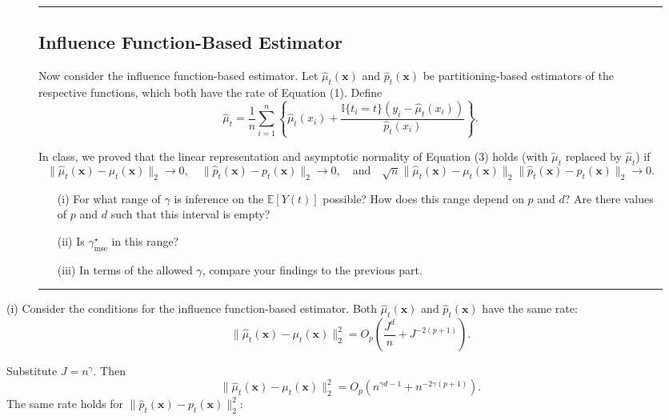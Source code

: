 \documentclass{article}
\newenvironment{colorparagraph}[1]{\par\color{#1}}{\par}
\begin{document}
\begin{figure}[H]
  \begin{colorparagraph}{questioncolor}
  \rule{\textwidth}{0.5pt}
  \label{q1h}
  \subsection{Influence Function-Based Estimator}

  Now consider the influence function-based estimator. Let \( \hat{\mu}_t(\mathbf{x}) \) and \( \hat{p}_t(\mathbf{x}) \) be partitioning-based estimators of the respective functions, which both have the rate of Equation (1). Define
  \[
  \hat{\mu}_t = \frac{1}{n} \sum_{i=1}^n \left\{ \hat{\mu}_t(x_i) + \frac{\mathbb{I}\{t_i = t\}(y_i - \hat{\mu}_t(x_i))}{\hat{p}_t(x_i)} \right\}.
  \]

  In class, we proved that the linear representation and asymptotic normality of Equation (3) holds (with \( \tilde{\mu}_t \) replaced by \( \hat{\mu}_t \)) if
  \[
  \|\hat{\mu}_t(\mathbf{x}) - \mu_t(\mathbf{x})\|_2 \to 0, \quad \|\hat{p}_t(\mathbf{x}) - p_t(\mathbf{x})\|_2 \to 0, \quad \text{and} \quad \sqrt{n} \|\hat{\mu}_t(\mathbf{x}) - \mu_t(\mathbf{x})\|_2 \|\hat{p}_t(\mathbf{x}) - p_t(\mathbf{x})\|_2 \to 0.
  \]

  \begin{itemize}
      \item[(i)] For what range of \( \gamma \) is inference on the \( \mathbb{E}[Y(t)] \) possible? How does this range depend on \( p \) and \( d \)? Are there values of \( p \) and \( d \) such that this interval is empty?
      \item[(ii)] Is \( \gamma^\star_{\text{mse}} \) in this range?
      \item[(iii)] In terms of the allowed \( \gamma \), compare your findings to the previous part.
  \end{itemize}

  \rule{\textwidth}{0.5pt}
  \end{colorparagraph}
\end{figure}

(i) Consider the conditions for the influence function-based estimator. Both \( \hat{\mu}_t(\mathbf{x}) \) and \( \hat{p}_t(\mathbf{x}) \) have the same rate:
$$
\|\hat{\mu}_t(\mathbf{x}) - \mu_t(\mathbf{x})\|_2^2 = O_p\left(\frac{J^d}{n} + J^{-2(p+1)}\right).
$$

Substitute \( J = n^\gamma \). Then
\[
\|\hat{\mu}_t(\mathbf{x}) - \mu_t(\mathbf{x})\|_2^2 = O_p\left(n^{\gamma d - 1} + n^{-2\gamma(p+1)}\right).
\]
The same rate holds for \(\|\hat{p}_t(\mathbf{x}) - p_t(\mathbf{x})\|_2^2\):
\end{document}
